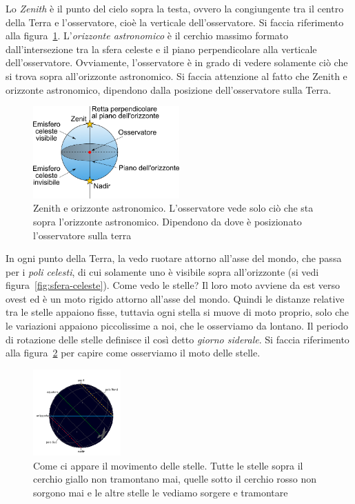 Lo \emph{Zenith} è il punto del cielo sopra la testa, ovvero la congiungente tra il centro della Terra e l'osservatore, cioè la verticale dell'osservatore. Si faccia riferimento alla figura~\ref{fig:zenith}. L'\emph{orizzonte astronomico} è il cerchio massimo formato dall'intersezione tra la sfera celeste e il piano perpendicolare alla verticale dell'osservatore. Ovviamente, l'osservatore è in grado di vedere solamente ciò che si trova sopra all'orizzonte astronomico. Si faccia attenzione al fatto che Zenith e orizzonte astronomico, dipendono dalla posizione dell'osservatore sulla Terra.

\begin{figure}
\centering
\includegraphics[width=0.5\textwidth]{immagini/zenit.png}
\caption{Zenith e orizzonte astronomico. L'osservatore vede solo ciò che sta sopra l'orizzonte astronomico. Dipendono da dove è posizionato l'osservatore sulla terra}
\label{fig:zenith}
\end{figure}

In ogni punto della Terra, la vedo ruotare attorno all'asse del mondo, che passa per i \emph{poli celesti}, di cui solamente uno è visibile sopra all'orizzonte (si vedi figura~\ref{fig:sfera-celeste}). Come vedo le stelle? Il loro moto avviene da est verso ovest ed è un moto rigido attorno all'asse del mondo. Quindi le distanze relative tra le stelle appaiono fisse, tuttavia ogni stella si muove di moto proprio, solo che le variazioni appaiono piccolissime a noi, che le osserviamo da lontano. Il periodo di rotazione delle stelle definisce il così detto \emph{giorno siderale}. Si faccia riferimento alla figura~\ref{fig:movimento-stelle} per capire come osserviamo il moto delle stelle.

\begin{figure}
\centering
\includegraphics[width=0.3\textwidth]{immagini/movimento-stelle.png}
\caption{Come ci appare il movimento delle stelle. Tutte le stelle sopra il cerchio giallo non tramontano mai, quelle sotto il cerchio rosso non sorgono mai e le altre stelle le vediamo sorgere e tramontare}
\label{fig:movimento-stelle}
\end{figure}

